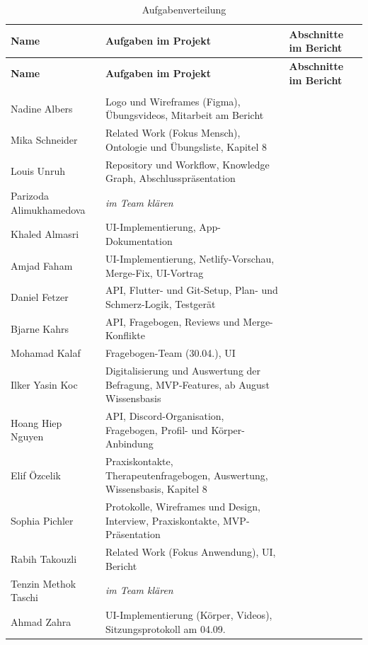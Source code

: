 \renewcommand{\arraystretch}{1.3}
\begin{xltabular}{\textwidth}{@{} >{\raggedright\arraybackslash}p{4.4cm} >{\raggedright\arraybackslash}X >{\raggedright\arraybackslash}p{2.6cm} @{}}
    \caption{Aufgabenverteilung}
    \label{tab:aufgabenverteilung} \\
    \toprule
    \textbf{Name} & \textbf{Aufgaben im Projekt} & \textbf{Abschnitte im Bericht} \\
    \midrule
    \endfirsthead
    \toprule
    \textbf{Name} & \textbf{Aufgaben im Projekt} & \textbf{Abschnitte im Bericht} \\
    \midrule
    \endhead
    \midrule
     \\
    \endfoot
    \bottomrule
    \endlastfoot
    Nadine Albers            & Logo und Wireframes (Figma), Übungsvideos, Mitarbeit am Bericht & \\
    Mika Schneider           & Related Work (Fokus Mensch), Ontologie und Übungsliste, Kapitel 8 & \\
    Louis Unruh              & Repository und Workflow, Knowledge Graph, Abschlusspräsentation & \\
    Parizoda Alimukhamedova  & \textit{im Team klären} & \\
    Khaled Almasri           & UI-Implementierung, App-Dokumentation & \\
    Amjad Faham              & UI-Implementierung, Netlify-Vorschau, Merge-Fix, UI-Vortrag & \\
    Daniel Fetzer            & API, Flutter- und Git-Setup, Plan- und Schmerz-Logik, Testgerät & \\
    Bjarne Kahrs             & API, Fragebogen, Reviews und Merge-Konflikte & \\
    Mohamad Kalaf            & Fragebogen-Team (30.04.), UI & \\
    Ilker Yasin Koc          & Digitalisierung und Auswertung der Befragung, MVP-Features, ab August Wissensbasis & \\
    Hoang Hiep Nguyen        & API, Discord-Organisation, Fragebogen, Profil- und Körper-Anbindung & \\
    Elif Özcelik             & Praxiskontakte, Therapeutenfragebogen, Auswertung, Wissensbasis, Kapitel 8 & \\
    Sophia Pichler           & Protokolle, Wireframes und Design, Interview, Praxiskontakte, MVP-Präsentation & \\
    Rabih Takouzli           & Related Work (Fokus Anwendung), UI, Bericht & \\
    Tenzin Methok Taschi     & \textit{im Team klären} & \\
    Ahmad Zahra              & UI-Implementierung (Körper, Videos), Sitzungsprotokoll am 04.09. & \\
    
\end{xltabular}
